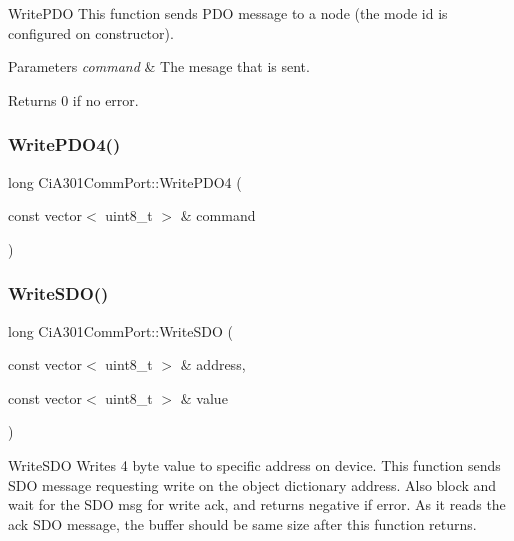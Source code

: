 Write\+P\+DO This function sends P\+DO message to a node (the mode id is configured on constructor). 


\begin{DoxyParams}{Parameters}
{\em command} & The mesage that is sent. \\
\hline
\end{DoxyParams}
\begin{DoxyReturn}{Returns}
0 if no error. 
\end{DoxyReturn}
\mbox{\label{classCiA301CommPort_a1faf4f37530e0dd0ae4600cfb0b1d742}} 
\subsubsection{\texorpdfstring{Write\+P\+D\+O4()}{WritePDO4()}}
{\footnotesize\ttfamily long Ci\+A301\+Comm\+Port\+::\+Write\+P\+D\+O4 (\begin{DoxyParamCaption}\item[{const vector$<$ uint8\+\_\+t $>$ \&}]{command }\end{DoxyParamCaption})}

\mbox{\label{classCiA301CommPort_a4d97c27423b2323f8475f6e5c2f91575}} 
\subsubsection{\texorpdfstring{Write\+S\+D\+O()}{WriteSDO()}}
{\footnotesize\ttfamily long Ci\+A301\+Comm\+Port\+::\+Write\+S\+DO (\begin{DoxyParamCaption}\item[{const vector$<$ uint8\+\_\+t $>$ \&}]{address,  }\item[{const vector$<$ uint8\+\_\+t $>$ \&}]{value }\end{DoxyParamCaption})}



Write\+S\+DO Writes 4 byte value to specific address on device. This function sends S\+DO message requesting write on the object dictionary address. Also block and wait for the S\+DO msg for write ack, and returns negative if error. As it reads the ack S\+DO message, the buffer should be same size after this function returns. 


